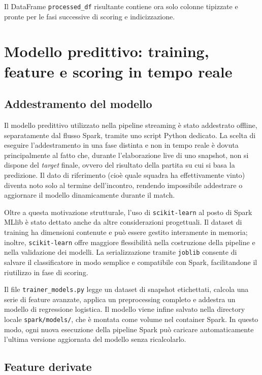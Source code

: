 \documentclass[a4paper,12pt]{report}
\begin{document}
Il DataFrame \texttt{processed\_df} risultante contiene ora solo colonne tipizzate e pronte per le fasi successive di scoring e indicizzazione.


\section{Modello predittivo: training, feature e scoring in tempo reale}

\subsection{Addestramento del modello}

Il modello predittivo utilizzato nella pipeline streaming è stato addestrato offline, separatamente dal flusso Spark, tramite uno script Python dedicato. La scelta di eseguire l’addestramento in una fase distinta e non in tempo reale è dovuta principalmente al fatto che, durante l’elaborazione live di uno snapshot, non si dispone del \textit{target} finale, ovvero del risultato della partita su cui si basa la predizione. Il dato di riferimento (cioè quale squadra ha effettivamente vinto) diventa noto solo al termine dell’incontro, rendendo impossibile addestrare o aggiornare il modello dinamicamente durante il match.

Oltre a questa motivazione strutturale, l’uso di \texttt{scikit-learn} al posto di Spark MLlib è stato dettato anche da altre considerazioni progettuali. Il dataset di training ha dimensioni contenute e può essere gestito interamente in memoria; inoltre, \texttt{scikit-learn} offre maggiore flessibilità nella costruzione della pipeline e nella validazione dei modelli. La serializzazione tramite \texttt{joblib} consente di salvare il classificatore in modo semplice e compatibile con Spark, facilitandone il riutilizzo in fase di scoring.

Il file \texttt{trainer\_models.py} legge un dataset di snapshot etichettati, calcola una serie di feature avanzate, applica un preprocessing completo e addestra un modello di regressione logistica. Il modello viene infine salvato nella directory locale \texttt{spark/models/}, che è montata come volume nel container Spark. In questo modo, ogni nuova esecuzione della pipeline Spark può caricare automaticamente l’ultima versione aggiornata del modello senza ricalcolarlo.

\subsection{Feature derivate}
\end{document}
